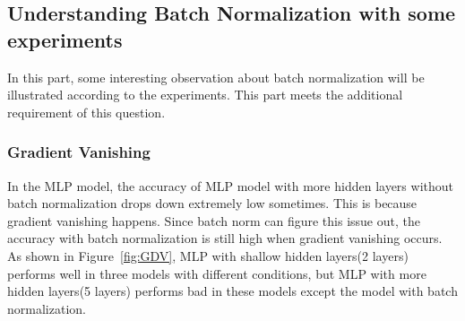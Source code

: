 \documentclass[12pt,letterpaper]{article}
\begin{document}
\subsection{Understanding Batch Normalization with some experiments}

In this part, some interesting observation about batch normalization will be illustrated according to the experiments. This part meets the additional requirement of this question.

\subsubsection{Gradient Vanishing}

In the MLP model, the accuracy of MLP model with more hidden layers without batch normalization drops down extremely low sometimes. This is because gradient vanishing happens. Since batch norm can figure this issue out, the accuracy with batch normalization is still high when gradient vanishing occurs. As shown in Figure~\ref{fig:GDV}, MLP with shallow hidden layers(2 layers) performs well in three models with different conditions, but MLP with more hidden layers(5 layers) performs bad in these models except the model with batch normalization.
\end{document}
